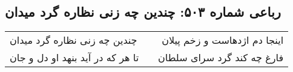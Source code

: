 \begin{center}
\section*{رباعی شماره ۵۰۳: چندین چه زنی نظاره گرد میدان}
\label{sec:sh503}
\begin{longtable}{l p{0.5cm} r}
چندین چه زنی نظاره گرد میدان
&&
اینجا دم اژدهاست و زخم پیلان
\\
تا هر که در آید بنهد او دل و جان
&&
فارغ چه کند گرد سرای سلطان
\\
\end{longtable}
\end{center}
